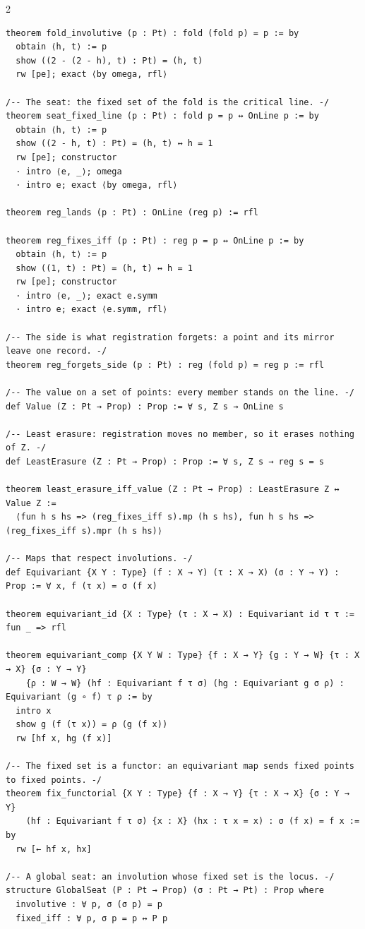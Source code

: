 \documentclass[10pt]{article}
\begin{document}
\begin{multicols}{2}
\begin{Verbatim}[fontsize=\fontsize{6.0}{6.9}\selectfont,breaklines,breakanywhere,breaksymbolleft={}]
theorem fold_involutive (p : Pt) : fold (fold p) = p := by
  obtain ⟨h, t⟩ := p
  show ((2 - (2 - h), t) : Pt) = (h, t)
  rw [pe]; exact ⟨by omega, rfl⟩

/-- The seat: the fixed set of the fold is the critical line. -/
theorem seat_fixed_line (p : Pt) : fold p = p ↔ OnLine p := by
  obtain ⟨h, t⟩ := p
  show ((2 - h, t) : Pt) = (h, t) ↔ h = 1
  rw [pe]; constructor
  · intro ⟨e, _⟩; omega
  · intro e; exact ⟨by omega, rfl⟩

theorem reg_lands (p : Pt) : OnLine (reg p) := rfl

theorem reg_fixes_iff (p : Pt) : reg p = p ↔ OnLine p := by
  obtain ⟨h, t⟩ := p
  show ((1, t) : Pt) = (h, t) ↔ h = 1
  rw [pe]; constructor
  · intro ⟨e, _⟩; exact e.symm
  · intro e; exact ⟨e.symm, rfl⟩

/-- The side is what registration forgets: a point and its mirror leave one record. -/
theorem reg_forgets_side (p : Pt) : reg (fold p) = reg p := rfl

/-- The value on a set of points: every member stands on the line. -/
def Value (Z : Pt → Prop) : Prop := ∀ s, Z s → OnLine s

/-- Least erasure: registration moves no member, so it erases nothing of Z. -/
def LeastErasure (Z : Pt → Prop) : Prop := ∀ s, Z s → reg s = s

theorem least_erasure_iff_value (Z : Pt → Prop) : LeastErasure Z ↔ Value Z :=
  ⟨fun h s hs => (reg_fixes_iff s).mp (h s hs), fun h s hs => (reg_fixes_iff s).mpr (h s hs)⟩

/-- Maps that respect involutions. -/
def Equivariant {X Y : Type} (f : X → Y) (τ : X → X) (σ : Y → Y) : Prop := ∀ x, f (τ x) = σ (f x)

theorem equivariant_id {X : Type} (τ : X → X) : Equivariant id τ τ := fun _ => rfl

theorem equivariant_comp {X Y W : Type} {f : X → Y} {g : Y → W} {τ : X → X} {σ : Y → Y}
    {ρ : W → W} (hf : Equivariant f τ σ) (hg : Equivariant g σ ρ) : Equivariant (g ∘ f) τ ρ := by
  intro x
  show g (f (τ x)) = ρ (g (f x))
  rw [hf x, hg (f x)]

/-- The fixed set is a functor: an equivariant map sends fixed points to fixed points. -/
theorem fix_functorial {X Y : Type} {f : X → Y} {τ : X → X} {σ : Y → Y}
    (hf : Equivariant f τ σ) {x : X} (hx : τ x = x) : σ (f x) = f x := by
  rw [← hf x, hx]

/-- A global seat: an involution whose fixed set is the locus. -/
structure GlobalSeat (P : Pt → Prop) (σ : Pt → Pt) : Prop where
  involutive : ∀ p, σ (σ p) = p
  fixed_iff : ∀ p, σ p = p ↔ P p


\end{Verbatim}
\end{multicols}
\end{document}
